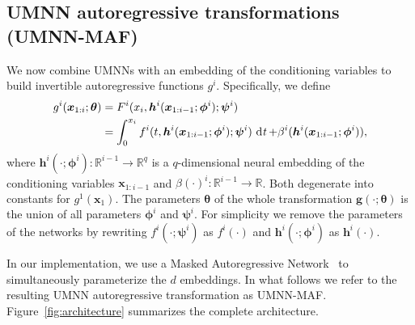 \subsection{UMNN autoregressive transformations (UMNN-MAF)} \label{sec:UMNN-MAF}

We now combine UMNNs with an embedding of the conditioning variables to build invertible autoregressive functions $g^i$. Specifically, we define
\begin{align}
    g^i(\mathbf{x}_{1 : i}; \mathbf{\theta}) &= F^i(x_i, \mathbf{h}^i(\mathbf{x}_{1 : i-1}; \mathbf{\phi}^i); \mathbf{\psi}^i)\nonumber\\
    &= \int^{x_i}_0 f^i(t, \mathbf{h}^i(\mathbf{x}_{1 : i-1}; \mathbf{\phi}^i); \mathbf{\psi}^i) \dt + \beta^i(\mathbf{h}^i(\mathbf{x}_{1 : i-1}; \mathbf{\phi}^i)),\label{eq:umnn}
\end{align}
where $\mathbf{h}^i(\cdot; \mathbf{\phi}^i): \mathbb{R}^{i-1} \rightarrow \mathbb{R}^{q}$ is a $q$-dimensional neural embedding of the conditioning variables $\mathbf{x}_{1:i-1}$ and $\beta(\cdot)^i: \mathbb{R}^{i-1} \rightarrow \mathbb{R}$. Both degenerate into constants for $g^1(\mathbf{x}_{1})$. The parameters $\mathbf{\theta}$ of the whole transformation $\mathbf{g}(\cdot; \mathbf{\theta})$ is the union of all parameters $\mathbf{\phi}^i$ and $\mathbf{\psi}^i$.
For simplicity we remove the parameters of the networks by rewriting $f^i(\cdot; \mathbf{\psi}^i)$ as $f^i(\cdot)$ and $\mathbf{h}^i(\cdot; \mathbf{\phi}^i)$ as $\mathbf{h}^i(\cdot)$.

In our implementation, we use a Masked Autoregressive Network~\citep{germain_made_2015, kingma_improved_2016, papamakarios_masked_2017} to simultaneously parameterize the $d$ embeddings. In what follows we refer to the resulting UMNN autoregressive transformation as UMNN-MAF.
Figure~\ref{fig:architecture} summarizes the complete architecture.

